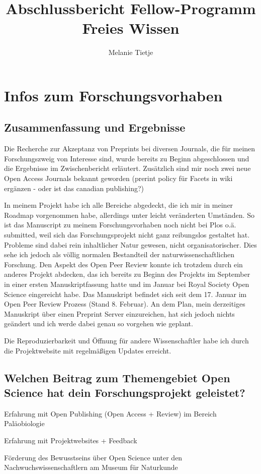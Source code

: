 \documentclass[11pt,a4paper]{article}
\begin{document}
\title{Abschlussbericht Fellow-Programm Freies Wissen}
\author{Melanie Tietje}
\maketitle


\section{Infos zum Forschungsvorhaben}%
\subsection{Zusammenfassung und Ergebnisse} %
Die Recherche zur Akzeptanz von Preprints bei diversen Journals, die für meinen Forschungszweig von Interesse sind, wurde bereits zu Beginn abgeschlossen und die Ergebnisse im Zwischenbericht erläutert. Zusätzlich sind mir noch zwei neue Open Access Journals bekannt geworden (prerint policy für Facets in wiki ergänzen - oder ist das canadian publishing?)

In meinem Projekt habe ich alle Bereiche abgedeckt, die ich mir in meiner Roadmap vorgenommen habe, allerdings unter leicht veränderten Umständen. So ist das Manuscript zu meinem Forschungsvorhaben noch nicht bei Plos o.ä. submitted, weil sich das Forschungsprojekt nicht ganz reibungslos gestaltet hat. Probleme sind dabei rein inhaltlicher Natur gewesen, nicht organisatorischer. Dies sehe ich jedoch als völlig normalen Bestandteil der naturwissenschaftlichen Forschung. Den Aspekt des Open Peer Review konnte ich trotzdem durch ein anderes Projekt abdecken, das ich bereits zu Beginn des Projekts im September in einer ersten Manuskriptfassung hatte und im Januar bei Royal Society Open Science eingereicht habe. Das Manuskript befindet sich seit dem 17. Januar im Open Peer Review Prozess (Stand 8. Februar). An dem Plan, mein derzeitiges Manuskript über einen Preprint Server einzureichen, hat sich jedoch nichts geändert und ich werde dabei genau so vorgehen wie geplant.

Die Reproduzierbarkeit und Öffnung für andere Wissenschaftler habe ich durch die Projektwebsite mit regelmäßigen Updates erreicht.

\subsection{Welchen Beitrag zum Themengebiet Open Science hat dein Forschungsprojekt geleistet?}%
\begin{compactitem}
\item Erfahrung mit Open Publishing (Open Access + Review) im Bereich Paläobiologie
\item Erfahrung mit Projektwebsites + Feedback
\item Förderung des Bewusstseins über Open Science unter den Nachwuchswissenschaftlern am Museum für Naturkunde
\end{compactitem}
\end{document}
